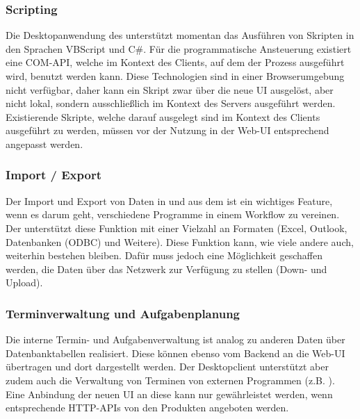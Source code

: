 \subsubsection{Scripting}
Die Desktopanwendung des  unterstützt momentan das Ausführen von Skripten in den Sprachen VBScript und C\#. Für die programmatische Ansteuerung existiert eine \gls{COM}-API, welche im Kontext des Clients, auf dem der Prozess ausgeführt wird, benutzt werden kann. Diese Technologien sind in einer Browserumgebung nicht verfügbar, daher kann ein Skript zwar über die neue UI ausgelöst, aber nicht lokal, sondern ausschließlich im Kontext des Servers ausgeführt werden. Existierende Skripte, welche darauf ausgelegt sind im Kontext des Clients ausgeführt zu werden, müssen vor der Nutzung in der Web-UI entsprechend angepasst werden.

\subsubsection{Import / Export}
Der Import und Export von Daten in und aus dem  ist ein wichtiges Feature, wenn es darum geht, verschiedene Programme in einem Workflow zu vereinen. Der  unterstützt diese Funktion mit einer Vielzahl an Formaten (Excel, Outlook, Datenbanken (ODBC) und Weitere). Diese Funktion kann, wie viele andere auch, weiterhin bestehen bleiben. Dafür muss jedoch eine Möglichkeit geschaffen werden, die Daten über das Netzwerk zur Verfügung zu stellen (Down- und Upload).

\subsubsection{Terminverwaltung und Aufgabenplanung}
Die interne Termin- und Aufgabenverwaltung ist analog zu anderen Daten über Datenbanktabellen realisiert. Diese können ebenso vom Backend an die Web-UI übertragen und dort dargestellt werden. Der Desktopclient unterstützt aber zudem auch die Verwaltung von Terminen von externen Programmen (z.B. ). Eine Anbindung der neuen UI an diese kann nur gewährleistet werden, wenn entsprechende HTTP-APIs von den Produkten angeboten werden.

